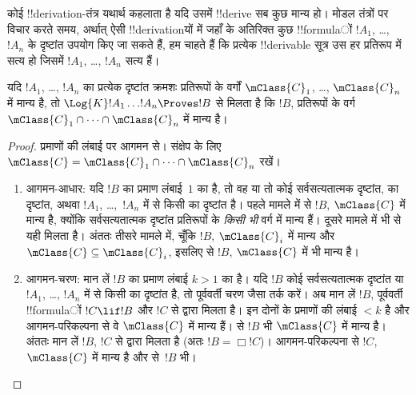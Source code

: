 \documentclass[../../../include/open-logic-section]{subfiles}
\begin{document}


कोई !!{derivation}-तंत्र यथार्थ कहलाता है यदि उसमें !!{derive} सब कुछ मान्य हो। मोडल तंत्रों पर विचार करते समय, अर्थात् ऐसी
!!{derivation}यों में जहाँ  के अतिरिक्त कुछ !!{formula}ों $!A_1$,
\dots,~$!A_n$ के दृष्टांत उपयोग किए जा सकते हैं, हम चाहते हैं कि प्रत्येक
!!{derivable} सूत्र उस हर प्रतिरूप में सत्य हो जिसमें $!A_1$, \dots,
$!A_n$ सत्य हैं।

\begin{thm}[यथार्थता प्रमेय]
  यदि $!A_1$, \dots, $!A_n$ का प्रत्येक दृष्टांत क्रमशः प्रतिरूपों के
  वर्गों $\mClass{C}_1$, \dots, $\mClass{C}_n$ में मान्य है, तो
  $\Log{K}!A_1\dots !A_n \Proves !B$ से मिलता है कि $!B$, प्रतिरूपों के
  वर्ग $\mClass{C}_1 \cap \dots \cap \mClass{C}_n$ में मान्य है।
\end{thm}

\begin{proof}
  प्रमाणों की लंबाई पर आगमन से। संक्षेप के लिए
  $\mClass{C}=\mClass{C}_1 \cap \dots \cap \mClass{C}_n$ रखें।
  \begin{enumerate}
  \item आगमन-आधार: यदि $!B$ का प्रमाण लंबाई~$1$ का है, तो वह या तो कोई
    सर्वसत्यतात्मक दृष्टांत,  का
    दृष्टांत, अथवा $!A_1$, \dots,~$!A_n$ में से किसी का दृष्टांत है। पहले
    मामले में  से $!B$, $\mClass{C}$ में
    मान्य है, क्योंकि सर्वसत्यतात्मक दृष्टांत प्रतिरूपों के \emph{किसी भी}
    वर्ग में मान्य हैं। दूसरे मामले में भी
     से यही मिलता है। अंततः तीसरे मामले
    में, चूँकि $!B$, $\mClass{C}_i$ में मान्य और
    $\mClass{C}\subseteq\mClass{C}_i$, इसलिए
     से $!B$, $\mClass{C}$ में भी मान्य है।
  \item आगमन-चरण: मान लें $!B$ का प्रमाण लंबाई $k>1$ का है। यदि $!B$ कोई
    सर्वसत्यतात्मक दृष्टांत या $!A_1$, \dots, $!A_n$ में से किसी का दृष्टांत
    है, तो पूर्ववर्ती चरण जैसा तर्क करें। अब मान लें $!B$, पूर्ववर्ती
    !!{formula}ों $!C \lif !B$ और $!C$ से \MP{} द्वारा मिलता है। इन दोनों के
    प्रमाणों की लंबाई $<k$ है और आगमन-परिकल्पना से वे $\mClass{C}$ में मान्य
    हैं।  से $!B$ भी $\mClass{C}$ में मान्य है।
    अंततः मान लें $!B$, $!C$ से \Nec{} द्वारा मिलता है (अतः
    $!B=\Box!C$)। आगमन-परिकल्पना से $!C$, $\mClass{C}$ में मान्य है और
     से~$!B$ भी।
  \end{enumerate}
\end{proof}
\end{document}

